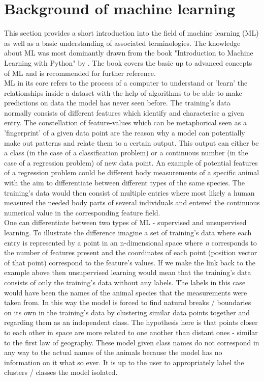 \section{Background of machine learning}
This section provides a short introduction into the field of machine learning (ML) as well as a basic understanding of associated terminologies. The knowledge about ML was most dominantly drawn from the book "Introduction to Machine Learning with Python" by \textcite{Guido2016}. The book covers the basic up to advanced concepts of ML and is recommended for further reference.\\
ML in its core refers to the process of a computer to understand or 'learn' the relationships inside a dataset with the help of algorithms to be able to make predictions on data the model has never seen before.
The training's data normally consists of different features which identify and characterise a given entry. The constellation of feature-values which can be metaphorical seen as a 'fingerprint' of a given data point are the reason why a model can potentially make out patterns and relate them to a certain output. This output can either be a class (in the case of a classification problem) or a continuous number (in the case of a regression problem) of new data point.
An example of potential features of a regression problem could be different body measurements of a specific animal with the aim to differentiate between different types of the same species. The training's data would then consist of multiple entries where most likely a human measured the needed body parts of several individuals and entered the continuous numerical value in the corresponding feature field.\\
\newline
One can differentiate between two types of ML - supervised and unsupervised learning. To illustrate the difference imagine a set of training's data where each entry is represented by a point in an n-dimensional space where \textit{n} corresponds to the number of features present and the coordinates of each point (position vector of that point) correspond to the feature's values. If we make the link back to the example above then unsupervised learning would mean that the training's data consists of only the training's data without any labels. The labels in this case would have been the names of the animal species that the measurements were taken from. In this way the model is forced to find natural breaks / boundaries on its own in the training's data by clustering similar data points together and regarding them as an independent class. The hypothesis here is that points closer to each other in space are more related to one another than distant ones - similar to the first law of geography. These model given class names do not correspond in any way to the actual names of the animals because the model has no information on it what so ever. It is up to the user to appropriately label the clusters / classes the model isolated.

